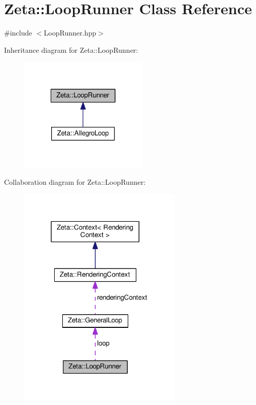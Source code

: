 \hypertarget{classZeta_1_1LoopRunner}{\section{Zeta\+:\+:Loop\+Runner Class Reference}
\label{classZeta_1_1LoopRunner}
}


{\ttfamily \#include $<$Loop\+Runner.\+hpp$>$}



Inheritance diagram for Zeta\+:\+:Loop\+Runner\+:\nopagebreak
\begin{figure}[H]
\begin{center}
\leavevmode
\includegraphics[width=174pt]{classZeta_1_1LoopRunner__inherit__graph}
\end{center}
\end{figure}


Collaboration diagram for Zeta\+:\+:Loop\+Runner\+:\nopagebreak
\begin{figure}[H]
\begin{center}
\leavevmode
\includegraphics[width=223pt]{classZeta_1_1LoopRunner__coll__graph}
\end{center}
\end{figure}
